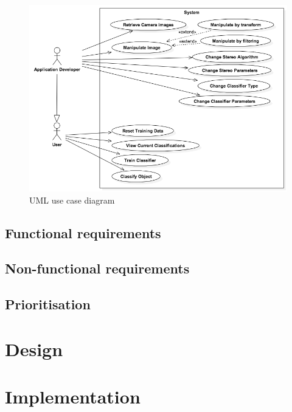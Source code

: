 \documentclass[11pt,oneside]{report}
\begin{document}
			\begin{figure}[!h]
			\begin{center}
    			\includegraphics[scale=0.5]{use_case_1}
    			\caption{UML use case diagram \protect {\label{use_case_1}}}
    		\end{center}
			\end{figure}		
		\section{Functional requirements}
		\section{Non-functional requirements}
		\section{Prioritisation}
	
	\chapter{Design}\label{chap:des}
	\chapter{Implementation}\label{chap:imp}
	
\end{document}
